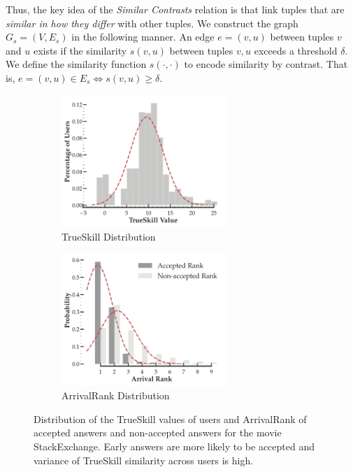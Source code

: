 Thus, the key idea of the \emph{Similar Contrasts} relation is that link tuples that are  \textit{similar in how they differ} with other tuples. We construct the graph $G_s = (V, E_s)$ in the following manner. An edge $e = (v,u)$ between tuples $v$ and $u$ exists if the similarity $s(v,u)$ between tuples $v,u$ exceeds a threshold $\delta$. We define the similarity function $s(\cdot , \cdot)$ to encode similarity by contrast. That is, $e=(v,u) \in E_s \iff s(v,u) \geq \delta$.

\begin{figure}[htb]
  \centering
  \begin{subfigure}{0.4\textwidth}
    \includegraphics[height=5cm,width=\textwidth]{figures/TrueSkill}
    \caption{TrueSkill Distribution}\label{fig:trueskill}
  \end{subfigure}%
  \begin{subfigure}{0.4\textwidth}
    \includegraphics[height=5cm,width=\textwidth]{figures/ArrivalRank}
    \caption{ArrivalRank Distribution}\label{fig:arrival}
  \end{subfigure}
  \caption{\label{fig:similarcontrastsempirical} Distribution of the TrueSkill values of users and ArrivalRank of accepted answers and non-accepted answers for the movie StackExchange. Early answers are more likely to be accepted and variance of TrueSkill similarity across users is high.}
\end{figure}


